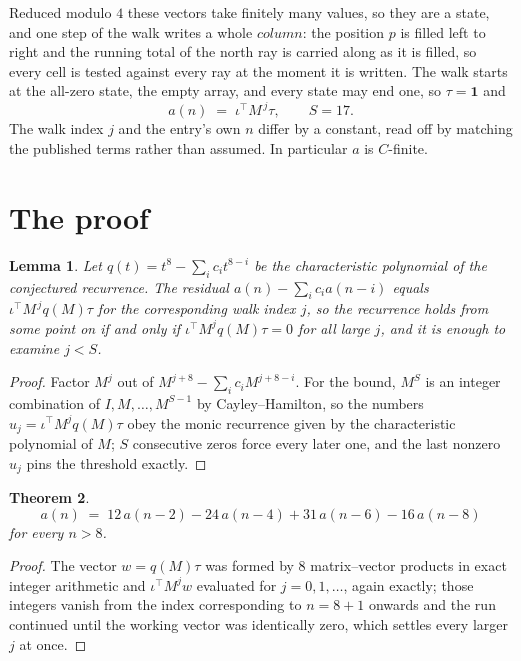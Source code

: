 \documentclass[11pt,a4paper]{article}
\theoremstyle{plain}
\newtheorem{theorem}{Theorem}
\newtheorem{lemma}[theorem]{Lemma}
\theoremstyle{definition}
\begin{document}
Reduced modulo $4$ these vectors take finitely many values, so they are a state, and one step
of the walk writes a whole $column$: the position $p$ is filled left to right and the
running total of the north ray is carried along as it is filled, so every cell is tested
against every ray at the moment it is written. The walk starts at the all-zero state, the empty
array, and every state may end one, so $\tau=\mathbf{1}$ and
\[
a(n)\;=\;\iota^{\!\top}M^{\,j}\tau ,\qquad S=17.
\]
The walk index $j$ and the entry's own $n$ differ by a constant, read off by matching the
published terms rather than assumed. In particular $a$ is $C$-finite.

\section{The proof}

\begin{lemma}\label{lem:crit}
Let $q(t)=t^{8}-\sum_i c_it^{8-i}$ be the characteristic polynomial of the
conjectured recurrence. The residual $a(n)-\sum_ic_ia(n-i)$ equals
$\iota^{\!\top}M^{\,j}q(M)\tau$ for the corresponding walk index $j$, so the recurrence
holds from some point on if and only if $\iota^{\!\top}M^{j}q(M)\tau=0$ for all large $j$,
and it is enough to examine $j<S$.
\end{lemma}

\begin{proof}
Factor $M^{j}$ out of $M^{j+8}-\sum_ic_iM^{j+8-i}$. For the bound, $M^{S}$
is an integer combination of $I,M,\dots,M^{S-1}$ by Cayley--Hamilton, so the numbers
$u_j=\iota^{\!\top}M^{j}q(M)\tau$ obey the monic recurrence given by the characteristic
polynomial of $M$; $S$ consecutive zeros force every later one, and the last nonzero $u_j$
pins the threshold exactly.
\end{proof}

\begin{theorem}
\[
a(n)\;=\;12\,a(n-2) - 24\,a(n-4) + 31\,a(n-6) - 16\,a(n-8)
\]
for every $n>8$.
\end{theorem}

\begin{proof}
The vector $w=q(M)\tau$ was formed by $8$ matrix--vector products in exact integer
arithmetic and $\iota^{\!\top}M^{j}w$ evaluated for $j=0,1,\dots$, again exactly; those
integers vanish from the index corresponding to $n=8+1$ onwards and the run continued
until the working vector was identically zero, which settles every larger $j$ at once.
\end{proof}
\end{document}
